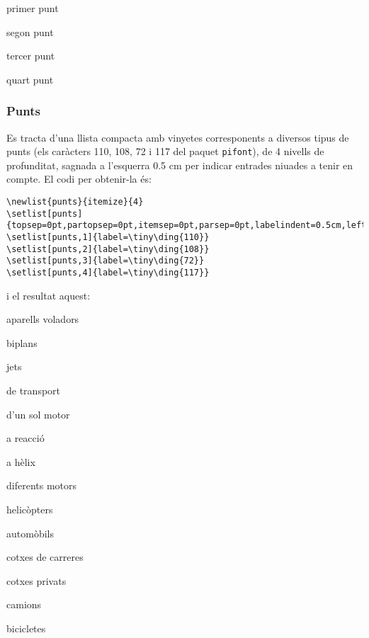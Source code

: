 \documentclass[a4paper,%
                             twoside,%
                             BCOR1.0cm,%
                             DIV11,%
                             parskip=full,%
                             11pt]{scrbook}
\begin{document}
\begin{atencio}
\item  primer punt
\item segon punt
\item tercer punt
\item quart punt
\end{atencio}

\subsubsection{Punts}\label{ssbsec:punts}
Es tracta d'una llista compacta amb vinyetes corresponents a diversos tipus de punts (els caràcters 110, 108, 72 i 117 del paquet \verb+pifont+), de 4 nivells de profunditat,  sagnada a l'esquerra 0.5 cm per indicar  entrades niuades a tenir en compte. El codi per obtenir-la és:
\begin{tiny}
\begin{verbatim}
\newlist{punts}{itemize}{4}
\setlist[punts]{topsep=0pt,partopsep=0pt,itemsep=0pt,parsep=0pt,labelindent=0.5cm,leftmargin=*}
\setlist[punts,1]{label=\tiny\ding{110}}
\setlist[punts,2]{label=\tiny\ding{108}}
\setlist[punts,3]{label=\tiny\ding{72}}
\setlist[punts,4]{label=\tiny\ding{117}}
\end{verbatim}
\end{tiny}
i el resultat aquest:
\begin{punts}
\item aparells voladors
	\begin{punts}
		\item biplans
		\item jets
		\item de transport
			\begin{punts}
				\item d'un sol motor
					\begin{punts}
						\item a reacció
						\item a hèlix
					\end{punts}
				\item diferents motors
			\end{punts}
		\item helicòpters
	\end{punts}
\item automòbils
	\begin{punts}
		\item cotxes de carreres
		\item cotxes privats
		\item camions
\end{punts}
\item bicicletes
\end{punts}
\end{document}
